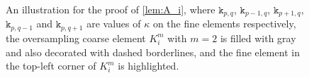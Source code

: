 \documentclass{article}
\begin{document}
\begin{figure}[h]
    \caption{An illustration for the proof of \cref{lem:A_i}, where $\mathtt{k}_{p,q}$, $\mathtt{k}_{p-1,q}$, $\mathtt{k}_{p+1,q}$, $\mathtt{k}_{p,q-1}$ and $\mathtt{k}_{p,q+1}$ are values of $\kappa$ on the fine elements respectively, the oversampling coarse element $K_i^m$ with $m=2$ is filled with gray and also decorated with dashed borderlines, and the fine element in the top-left corner of $K_i^m$ is highlighted.}
    \label{fig:illustration}
\end{figure}
\end{document}
